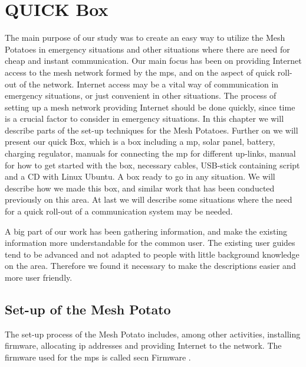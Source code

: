 \chapter{QUICK Box}
\label{chp:quickrollout} 

The main purpose of our study was to create an easy way to utilize the Mesh Potatoes in emergency situations and other situations where there are need for cheap and instant communication. Our main focus has been on providing Internet access to the mesh network formed by the \glspl{mp}, and on the aspect of quick roll-out of the network. Internet access may be a vital way of communication in emergency situations, or just convenient in other situations. The process of setting up a mesh network providing Internet should be done quickly, since time is a crucial factor to consider in emergency situations. In this chapter we will describe parts of the set-up techniques for the Mesh Potatoes. Further on we will present our \gls{quick} Box, which is a box including a \gls{mp}, solar panel, battery, charging regulator, manuals for connecting the \gls{mp} for different up-links, manual for how to get started with the box, necessary cables, USB-stick containing script and a CD with Linux Ubuntu. A box ready to go in any situation. We will describe how we made this box, and similar work that has been conducted previously on this area. At last we will describe some situations where the need for a quick roll-out of a communication system may be needed. 

A big part of our work has been gathering information, and make the existing information more understandable for the common user. The existing user guides tend to be advanced and not adapted to people with little background knowledge on the area. Therefore we found it necessary to make the descriptions easier and more user friendly. 

\section{Set-up of the Mesh Potato}
The set-up process of the Mesh Potato includes, among other activities, installing firmware, allocating \gls{ip} addresses and providing Internet to the network. The firmware used for the \glspl{mp} is called \gls{secn} Firmware \cite{ChoosingFirmware}. 

